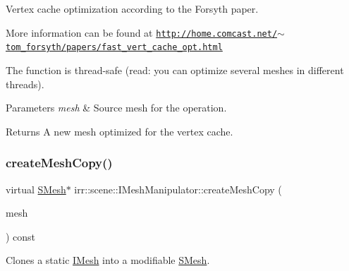 Vertex cache optimization according to the Forsyth paper. 

More information can be found at \href{http://home.comcast.net/~tom_forsyth/papers/fast_vert_cache_opt.html}{\tt http\+://home.\+comcast.\+net/$\sim$tom\+\_\+forsyth/papers/fast\+\_\+vert\+\_\+cache\+\_\+opt.\+html}

The function is thread-\/safe (read\+: you can optimize several meshes in different threads).


\begin{DoxyParams}{Parameters}
{\em mesh} & Source mesh for the operation. \\
\hline
\end{DoxyParams}
\begin{DoxyReturn}{Returns}
A new mesh optimized for the vertex cache. 
\end{DoxyReturn}
\mbox{\label{classirr_1_1scene_1_1IMeshManipulator_a3d2e7401f1d43919834a1bfe0b65e77f}} 
\subsubsection{\texorpdfstring{create\+Mesh\+Copy()}{createMeshCopy()}\hspace{0.1cm}{\footnotesize\ttfamily [1/2]}}
{\footnotesize\ttfamily virtual \hyperlink{structirr_1_1scene_1_1SMesh}{S\+Mesh}$\ast$ irr\+::scene\+::\+I\+Mesh\+Manipulator\+::create\+Mesh\+Copy (\begin{DoxyParamCaption}\item[{\hyperlink{classirr_1_1scene_1_1IMesh}{I\+Mesh} $\ast$}]{mesh }\end{DoxyParamCaption}) const\hspace{0.3cm}{\ttfamily [pure virtual]}}



Clones a static \hyperlink{classirr_1_1scene_1_1IMesh}{I\+Mesh} into a modifiable \hyperlink{structirr_1_1scene_1_1SMesh}{S\+Mesh}. 

